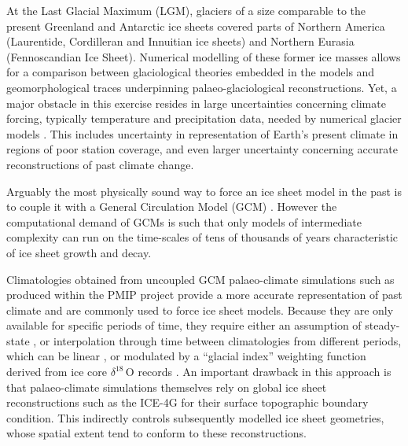 \introduction
\label{sec:intro}

At the Last Glacial Maximum (LGM), glaciers of a size comparable to the present Greenland and Antarctic ice sheets covered parts of Northern America (Laurentide, Cordilleran and Innuitian ice sheets) and Northern Eurasia (Fennoscandian Ice Sheet). Numerical modelling of these former ice masses allows for a comparison between glaciological theories embedded in the models and geomorphological traces underpinning palaeo-glaciological reconstructions. Yet, a major obstacle in this exercise resides in large uncertainties concerning climate forcing, typically temperature and precipitation data, needed by numerical glacier models \citep{hebeler-etal-2008}. This includes uncertainty in representation of Earth's present climate in regions of poor station coverage, and even larger uncertainty concerning accurate reconstructions of past climate change.

Arguably the most physically sound way to force an ice sheet model in the past is to couple it with a General Circulation Model (GCM) \citep{yoshimori-etal-2001,calov-etal-2002,abeouchi-etal-2007,charbit-etal-2013}. However the computational demand of GCMs is such that only models of intermediate complexity can run on the time-scales of tens of thousands of years characteristic of ice sheet growth and decay.

Climatologies obtained from uncoupled GCM palaeo-climate simulations such as produced within the PMIP project \citep{joussaume-taylor-1995} provide a more accurate representation of past climate and are commonly used to force ice sheet models. Because they are only available for specific periods of time, they require either an assumption of steady-state \citep{huybrechts-tsiobbel-1996}, or interpolation through time between climatologies from different periods, which can be linear \citep{charbit-etal-2002}, or modulated by a ``glacial index'' weighting function derived from ice core $\delta^{18}$\,O records \citep{marshall-clarke-1999,tarasov-peltier-2004,zweck-huybrechts-2005,gregoire-etal-2012}. An important drawback in this approach is that palaeo-climate simulations themselves rely on global ice sheet reconstructions such as the ICE-4G \citep{peltier-1994} for their surface topographic boundary condition. This indirectly controls subsequently modelled ice sheet geometries, whose spatial extent tend to conform to these reconstructions.

